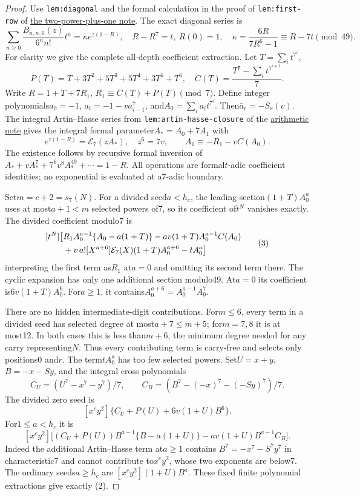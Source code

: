 \documentclass[11pt]{article}
\begin{document}
\begin{proof}
Use \texttt{lem:diagonal} and the formal calculation in the proof
of \texttt{lem:first-row} of
\href{GAP_SIX_TWO_POWER_PLUS_ONE_SFC.tex}{the two-power-plus-one note}.
The exact diagonal series is
\[
 \sum_{n\ge0}\frac{B_{n,n,6}(z)}{6^nn!}t^n
 =\kappa e^{z(1-R)},\quad R-R^7=t,\ R(0)=1,\quad
 \kappa=\frac{6R}{7R^6-1}\equiv R-7t\pmod{49}.
\]
For clarity we give the complete all-depth coefficient extraction.
Let $T=\sum_it^{7^i}$,
\[
 P(T)=T+3T^2+5T^3+5T^4+3T^5+T^6,\quad
 C(T)=\frac{T^7-\sum_it^{7^{i+1}}}{7}.
\]
Write $R=1+T+7R_1$, $R_1\equiv C(T)+P(T)\pmod7$.
Define integer polynomials$a_0=-1$,
$a_i=-1-va_{i-1}^7$, and$A_0=\sum_i a_it^{7^i}$.
Then$\bar a_r=-S_r(v)$.
The integral Artin--Hasse series from
\texttt{lem:artin-hasse-closure} of the
\href{ARITHMETIC_FRONTIER_TERMINAL_ORDERS.tex}{arithmetic note}
gives the integral formal parameter$A_*=A_0+7A_1$ with
\[
 e^{z(1-R)}=\mathcal E_7(zA_*),\quad z^6=7v,\qquad
 A_1\equiv-R_1-vC(A_0).
\]
The existence follows by recursive formal inversion of
$A_*+vA_*^7+7^6v^8A_*^{49}+\cdots=1-R$.
All operations are formal$t$-adic coefficient identities;
no exponential is evaluated at a7-adic boundary.

Set$m=c+2=s_7(N)$. For a divided seed$a<h_c$,
the leading section$(1+T)A_0^a$ uses at most$a+1<m$ selected
powers of7, so its coefficient of$t^N$ vanishes exactly.
The divided coefficient modulo7 is
\[
\begin{aligned}
 \relax[t^N]\bigl[&
 R_1A_0^{a-1}\{A_0-a(1+T)\}
 -av(1+T)A_0^{a-1}C(A_0)\\
 &+v\,a![X^{a+6}]\mathcal E_7(X)(1+T)A_0^{a+6}
                                  -tA_0^a\bigr]
\end{aligned}                                                \tag{3}
\]
interpreting the first term as$R_1$ at$a=0$ and omitting its
second term there. The cyclic expansion has only one additional
section modulo49. At$a=0$ its coefficient is$6v(1+T)A_0^6$.
For$a\ge1$, it contains$A_0^{a+6}=A_0^{a-1}A_0^7$.

There are no hidden intermediate-digit contributions.
For$m\le6$, every term in a divided seed has selected degree
at most$a+7\le m+5$; for$m=7,8$ it is at most12.
In both cases this is less than$m+6$, the minimum degree needed
for any carry representing$N$.
Thus every contributing term is carry-free and selects only
positions0 and$r$.
The term$tA_0^a$ has too few selected powers.
Set$U=x+y$, $B=-x-Sy$, and the integral cross polynomials
\[
 C_U=(U^7-x^7-y^7)/7,\qquad
 C_B=(B^7-(-x)^7-(-Sy)^7)/7 .
\]
The divided zero seed is
\[
 [x^cy^2]\{C_U+P(U)+6v(1+U)B^6\}.                            \tag{4}
\]
For$1\le a<h_c$ it is
\[
 [x^cy^2]\bigl[
 (C_U+P(U))B^{a-1}\{B-a(1+U)\}
                 -av(1+U)B^{a-1}C_B\bigr].                 \tag{5}
\]
Indeed the additional Artin--Hasse term at$a\ge1$ contains
$B^7=-x^7-S^7y^7$ in characteristic7 and cannot contribute
to$x^cy^2$, whose two exponents are below7.
The ordinary seeds$a\ge h_c$ are
$[x^cy^2](1+U)B^a$.
These fixed finite polynomial extractions give exactly (2).


\end{proof}
\end{document}
